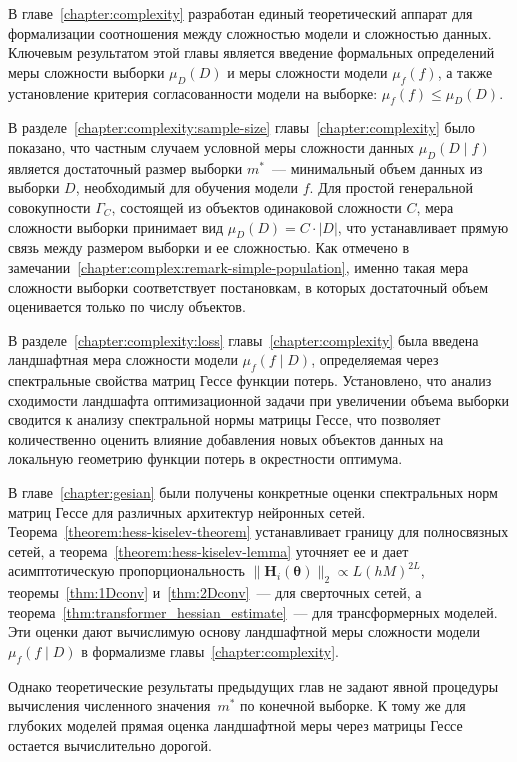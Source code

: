 В главе~\ref{chapter:complexity} разработан единый теоретический аппарат для формализации соотношения между сложностью модели и сложностью данных. Ключевым результатом этой главы является введение формальных определений меры сложности выборки $\mu_D(D)$ и меры сложности модели $\mu_f(f)$, а также установление критерия согласованности модели на выборке: $\mu_f(f) \leq \mu_D(D)$.

В разделе~\ref{chapter:complexity:sample-size} главы~\ref{chapter:complexity} было показано, что частным случаем условной меры сложности данных $\mu_D(D\mid f)$ является достаточный размер выборки $m^*$~--- минимальный объем данных из выборки $D$, необходимый для обучения модели $f$. Для простой генеральной совокупности $\Gamma_C$, состоящей из объектов одинаковой сложности $C$, мера сложности выборки принимает вид $\mu_D(D) = C \cdot |D|$, что устанавливает прямую связь между размером выборки и ее сложностью.
Как отмечено в замечании~\ref{chapter:complex:remark-simple-population}, именно такая мера сложности выборки соответствует постановкам, в которых достаточный объем оценивается только по числу объектов.

В разделе~\ref{chapter:complexity:loss} главы~\ref{chapter:complexity} была введена ландшафтная мера сложности модели $\mu_f(f\mid D)$, определяемая через спектральные свойства матриц Гессе функции потерь. Установлено, что анализ сходимости ландшафта оптимизационной задачи при увеличении объема выборки сводится к анализу спектральной нормы матрицы Гессе, что позволяет количественно оценить влияние добавления новых объектов данных на локальную геометрию функции потерь в окрестности оптимума.

В главе~\ref{chapter:gesian} были получены конкретные оценки спектральных норм матриц Гессе для различных архитектур нейронных сетей. Теорема~\ref{theorem:hess-kiselev-theorem} устанавливает границу для полносвязных сетей, а теорема~\ref{theorem:hess-kiselev-lemma} уточняет ее и дает асимптотическую пропорциональность $\|\mathbf{H}_i(\boldsymbol{\theta})\|_2 \propto L(hM)^{2L}$, теоремы~\ref{thm:1Dconv} и~\ref{thm:2Dconv}~--- для сверточных сетей, а теорема~\ref{thm:transformer_hessian_estimate}~--- для трансформерных моделей. Эти оценки дают вычислимую основу ландшафтной меры сложности модели $\mu_f(f\mid D)$ в формализме главы~\ref{chapter:complexity}.

Однако теоретические результаты предыдущих глав не задают явной процедуры вычисления численного значения~$m^*$ по конечной выборке. К тому же для глубоких моделей прямая оценка ландшафтной меры через матрицы Гессе остается вычислительно дорогой.

